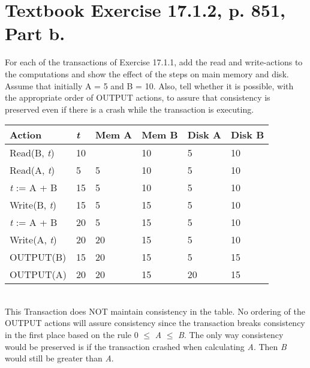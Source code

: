 \documentclass [letter,12pt] {article}
\begin{document}
\section{Textbook Exercise 17.1.2, p. 851, Part b.}
    For each of the transactions of Exercise 17.1.1, add the read and 
    write-actions to the computations and show the effect of the steps 
    on main memory and disk. Assume that initially A = 5 and B = 10. Also,
    tell whether it is possible, with the appropriate order of OUTPUT
    actions, to assure that consistency is preserved even if there is 
    a crash while the transaction is executing.
    \begin{table}[htp]
        \centering
        \begin{tabular}{l|l|l|l|l|l}
            Action      & \textit{t}  & Mem A & Mem B & Disk A & Disk B \\
            \hline
            Read(B, \textit{t})  & 10 &       & 10    & 5      & 10     \\
            Read(A, \textit{t})  & 5  & 5     & 10    & 5      & 10     \\
            \textit{t} := A + B  & 15 & 5     & 10    & 5      & 10     \\
            Write(B, \textit{t}) & 15 & 5     & 15    & 5      & 10     \\
            \textit{t} := A + B  & 20 & 5     & 15    & 5      & 10     \\
            Write(A, \textit{t}) & 20 & 20    & 15    & 5      & 10     \\
            OUTPUT(B)   & 15 & 20    & 15    & 5      & 15     \\
            OUTPUT(A)   & 20 & 20    & 15    & 20     & 15     \\      
        \end{tabular}
    \end{table}
    \\
    This Transaction does NOT maintain consistency in the table. No 
    ordering of the OUTPUT actions will assure consistency since the
    transaction breaks consistency in the first place based on the 
    rule 0 $\leq$ \textit{A} $\leq$ \textit{B}. The only way consistency
    would be preserved is if the transaction crashed when calculating 
    \textit{A}. Then \textit{B} would still be greater than \textit{A}.
\end{document}
